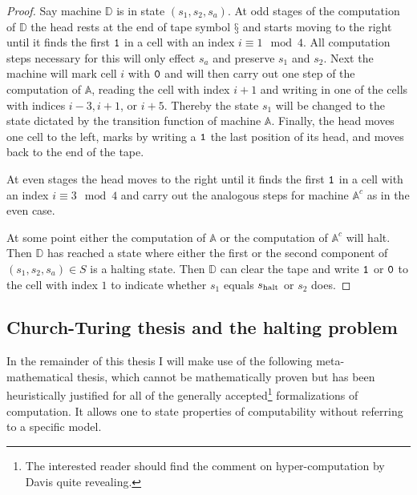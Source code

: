 \begin{proof}
  Say machine \(\mathbb{D}\) is in state \((s_1, s_2, s_a)\). At odd stages of
  the computation of \(\mathbb{D}\) the head rests at the end of tape symbol
  \(§\) and starts moving to the right until it finds the first \(\mathtt{1}\) in a
  cell with an index \(i \equiv 1 \mod 4\). All computation steps necessary for
  this will only effect \(s_a\) and preserve \(s_1\) and \(s_2\).
  Next the machine will mark cell \(i\) with \(\mathtt{0}\) and will then carry out
  one step of the computation of \(\mathbb{A}\), reading the cell with index \(i
  + 1\) and writing in one of the cells with indices \(i - 3, i + 1\), or \(i +
  5\). Thereby the state \(s_1\) will be changed to the state dictated by the
  transition function of machine \(\mathbb{A}\).
  Finally, the head moves one cell to the left, marks by writing a \(\mathtt{1}\) the
  last position of its head, and moves back to the end of the tape.

  At even stages the head moves to the right until it finds the first \(\mathtt{1}\)
  in a cell with an index \(i \equiv 3 \mod 4\) and carry out the analogous
  steps for machine \(\mathbb{A}^c\) as in the even case.

  At some point either the computation of \(\mathbb{A}\) or the computation of
  \(\mathbb{A}^c\) will halt. Then \(\mathbb{D}\) has reached a state where
  either the first or the second component of \((s_1, s_2, s_a) ∈ S\) is a
  halting state. Then \(\mathbb{D}\) can clear the tape and write \(\mathtt{1}\) or
  \(\mathtt{0}\) to the cell with index \(1\) to indicate whether \(s_1\) equals
  \(s_{\text{halt}}\) or \(s_2\) does.
\end{proof}

\subsection{Church-Turing thesis and the halting problem}

In the remainder of this thesis I will make use of the following
meta-mathematical thesis, which cannot be mathematically proven but has been
heuristically justified for all of the generally accepted\footnote{The
interested reader should find the comment \cite{Davis2006} on hyper-computation
by Davis quite revealing.} formalizations of computation. It allows one to state
properties of computability without referring to a specific model.

